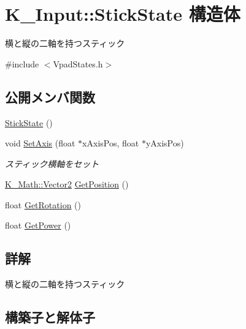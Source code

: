 \hypertarget{struct_k___input_1_1_stick_state}{}\section{K\+\_\+\+Input\+:\+:Stick\+State 構造体}
\label{struct_k___input_1_1_stick_state}


横と縦の二軸を持つスティック  




{\ttfamily \#include $<$Vpad\+States.\+h$>$}

\subsection*{公開メンバ関数}
\begin{DoxyCompactItemize}
\item 
\mbox{\hyperlink{struct_k___input_1_1_stick_state_aac73cf2559099f71649f184c80eaa684}{Stick\+State}} ()
\item 
void \mbox{\hyperlink{struct_k___input_1_1_stick_state_a24b313d487c3989e99acf1ea02c1d43c}{Set\+Axis}} (float $\ast$x\+Axis\+Pos, float $\ast$y\+Axis\+Pos)
\begin{DoxyCompactList}\small\item\em スティック横軸をセット \end{DoxyCompactList}\item 
\mbox{\hyperlink{namespace_k___math_a41eb0c2c69c938cd59989eb3241cefb2}{K\+\_\+\+Math\+::\+Vector2}} \mbox{\hyperlink{struct_k___input_1_1_stick_state_a05da68756276401e5c044c7bc7731efa}{Get\+Position}} ()
\item 
float \mbox{\hyperlink{struct_k___input_1_1_stick_state_a151feefe8323c18265ca90a005ba403a}{Get\+Rotation}} ()
\item 
float \mbox{\hyperlink{struct_k___input_1_1_stick_state_a76e98e4459f311a5500f8bfef1c3b5f5}{Get\+Power}} ()
\end{DoxyCompactItemize}


\subsection{詳解}
横と縦の二軸を持つスティック 

\subsection{構築子と解体子}
\mbox{\label{struct_k___input_1_1_stick_state_aac73cf2559099f71649f184c80eaa684}} 
